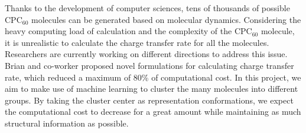 \documentclass[a4paper]{article}
\begin{document}
Thanks to the development of computer sciences, tens of thousands of possible \(\text{CPC}_{60}\) molecules can be generated based on molecular dynamics. Considering the heavy computing load of calculation and the complexity of the \(\text{CPC}_{60}\) molecule, it is unrealistic to calculate the charge transfer rate for all the molecules. Researchers are currently working on different directions to address this issue. Brian and co-worker proposed novel formulations for calculating charge transfer rate, which reduced a maximum of 80\% of computational cost. In this project, we aim to make use of machine learning to cluster the many molecules into different groups. By taking the cluster center as representation conformations, we expect the computational cost to decrease for a great amount while maintaining as much structural information as possible.
\end{document}
